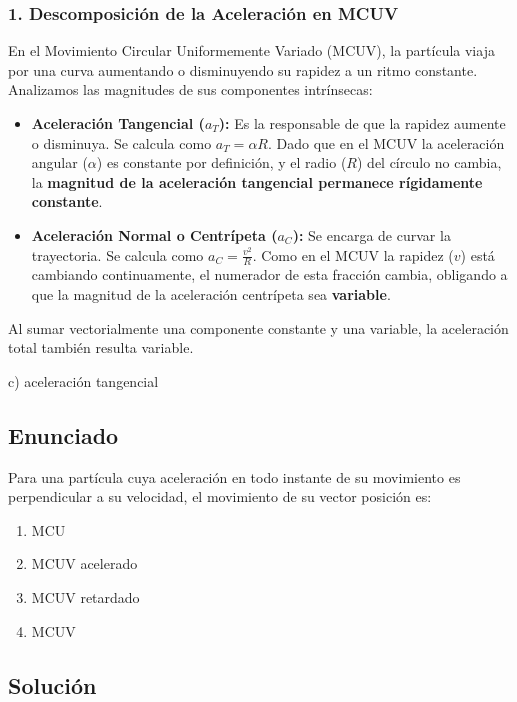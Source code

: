 \documentclass[12pt, a4paper]{article}
\begin{document}
\subsubsection*{1. Descomposición de la Aceleración en MCUV}
En el Movimiento Circular Uniformemente Variado (MCUV), la partícula viaja por una curva aumentando o disminuyendo su rapidez a un ritmo constante. 
Analizamos las magnitudes de sus componentes intrínsecas:
\begin{itemize}
    \item \textbf{Aceleración Tangencial ($a_T$):} Es la responsable de que la rapidez aumente o disminuya. Se calcula como $a_T = \alpha R$. Dado que en el MCUV la aceleración angular ($\alpha$) es constante por definición, y el radio ($R$) del círculo no cambia, la \textbf{magnitud de la aceleración tangencial permanece rígidamente constante}.
    \item \textbf{Aceleración Normal o Centrípeta ($a_C$):} Se encarga de curvar la trayectoria. Se calcula como $a_C = \frac{v^2}{R}$. Como en el MCUV la rapidez ($v$) está cambiando continuamente, el numerador de esta fracción cambia, obligando a que la magnitud de la aceleración centrípeta sea \textbf{variable}.
\end{itemize}
Al sumar vectorialmente una componente constante y una variable, la aceleración total también resulta variable. 

\begin{tcolorbox}[colback=green!5!white, colframe=green!50!black, title=Respuesta Final]
\centering \Large c) aceleración tangencial
\end{tcolorbox}

\newpage

\subsection*{Enunciado}
Para una partícula cuya aceleración en todo instante de su movimiento es perpendicular a su velocidad, el movimiento de su vector posición es:
\begin{enumerate}[label=\alph*)]
    \item MCU
    \item MCUV acelerado
    \item MCUV retardado
    \item MCUV
\end{enumerate}

\subsection*{Solución}
\end{document}

